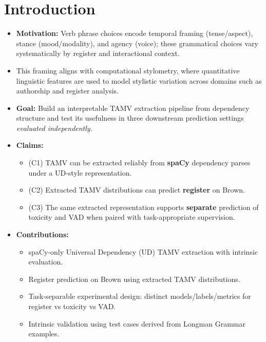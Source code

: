 \documentclass[11pt]{article}
\begin{document}
\section{Introduction}
\begin{itemize}
  \item \textbf{Motivation:} Verb phrase choices encode temporal framing (tense/aspect), stance (mood/modality), and agency (voice); these grammatical choices vary systematically by register and interactional context. \citep{Biber20101999LongmanEnglish}
  \item This framing aligns with computational stylometry, where quantitative linguistic features are used to model stylistic variation across domains such as authorship and register analysis. \citep{Holmes1998EvolutionStylometry,Stamatatos2009SurveyMethods}
  \item \textbf{Goal:} Build an interpretable TAMV extraction pipeline from dependency structure and test its usefulness in three downstream prediction settings \emph{evaluated independently}.
  \item \textbf{Claims:}
    \begin{itemize}
      \item (C1) TAMV can be extracted reliably from \textbf{spaCy} dependency parses under a UD-style representation. \citep{Ramm2017AnnotatingGerman,Nivre2010DependencyParsing}
      \item (C2) Extracted TAMV distributions can predict \textbf{register} on Brown. \citep{19684/682R15.00.}
      \item (C3) The same extracted representation supports \textbf{separate} prediction of toxicity and VAD when paired with task-appropriate supervision.
    \end{itemize}
  \item \textbf{Contributions:}
    \begin{itemize}
      \item spaCy-only Universal Dependency (UD) TAMV extraction with intrinsic evaluation. \citep{Ramm2017AnnotatingGerman,DonickeClause-LevelGerman}
      \item Register prediction on Brown using extracted TAMV distributions. \citep{19684/682R15.00.}
      \item Task-separable experimental design: distinct models/labels/metrics for register vs toxicity vs VAD.
      \item Intrinsic validation using test cases derived from Longman Grammar examples. \citep{Biber20101999LongmanEnglish}
    \end{itemize}
\end{itemize}
\end{document}
